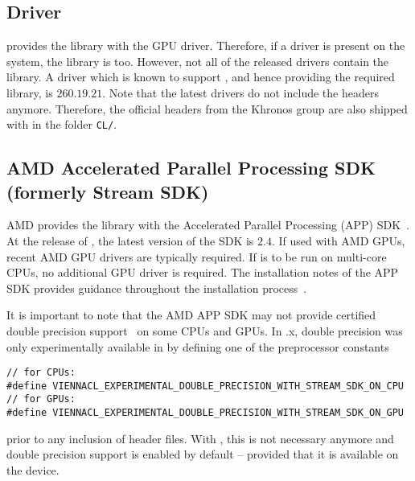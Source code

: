 \subsection{\NVIDIA Driver}
\NVIDIA provides the {\OpenCL} library with the GPU driver. Therefore, if a 
\NVIDIA driver is present on the system, the library is too. However, 
not all of the released drivers contain the {\OpenCL} library. 
A driver which is known to support {\OpenCL}, and hence providing the required
library, is $260.19.21$. Note that the latest {\NVIDIA} drivers do not include
the {\OpenCL} headers anymore. Therefore, the official {\OpenCL} headers from
the Khronos group \cite{khronoscl} are also shipped with {\ViennaCL} in the
folder \lstinline|CL/|.

\subsection{AMD Accelerated Parallel Processing SDK (formerly Stream SDK)} \label{sec:opencl-on-ati}
AMD provides the {\OpenCL} library with the Accelerated Parallel Processing (APP)
SDK~\cite{atistream}. At the release of {\ViennaCLversion}, the latest version of the
SDK is $2.4$. If used with AMD GPUs, recent AMD GPU drivers are typically required. If {\ViennaCL} is to be run on multi-core CPUs,
no additional GPU driver is required. The installation notes
of the APP SDK provides guidance throughout the
installation process~\cite{atistreamdocu}. 


It is important to note that the AMD APP SDK may not provide {\OpenCL}
certified double precision support~\cite{atidouble} on some CPUs and GPUs. In
.x, double precision was only experimentally available in
{\ViennaCL} by defining one of the preprocessor constants
\begin{lstlisting}
// for CPUs:
#define VIENNACL_EXPERIMENTAL_DOUBLE_PRECISION_WITH_STREAM_SDK_ON_CPU
// for GPUs:
#define VIENNACL_EXPERIMENTAL_DOUBLE_PRECISION_WITH_STREAM_SDK_ON_GPU
\end{lstlisting}
prior to any inclusion of {\ViennaCL} header files. With
{\ViennaCLminorversion}, this is not necessary anymore and double precision
support is enabled by default -- provided that it is available on the device.

